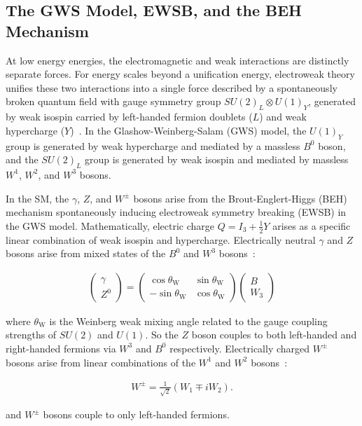 \subsection{The GWS Model, EWSB, and the BEH Mechanism}
At low energy energies, the electromagnetic and weak interactions are distinctly separate forces.
For energy scales beyond a unification energy, electroweak theory unifies these two interactions into a single force described by a spontaneously broken quantum field with gauge symmetry group $SU(2)_L \otimes U(1)_Y$, generated by weak isospin carried by left-handed fermion doublets ($L$) and weak hypercharge ($Y$)~\cite{nagashima_2013_V2}.
In the Glashow-Weinberg-Salam (GWS) model, the $U(1)_Y$ group is generated by weak hypercharge and mediated by a massless $B^0$ boson, and the $SU(2)_L$ group is generated by weak isospin and mediated by massless $W^1$, $W^2$, and $W^3$ bosons.

In the SM, the $\gamma$, $Z$, and $W^\pm$ bosons arise from the Brout-Englert-Higgs (BEH) mechanism spontaneously inducing electroweak symmetry breaking (EWSB) in the GWS model.
Mathematically, electric charge $Q = I_3 + \frac{1}{2} Y$ arises as a specific linear combination of weak isospin and hypercharge.
Electrically neutral $\gamma$ and $Z$ bosons arise from mixed states of the $B^0$ and $W^3$ bosons~\cite{nagashima_2013_V2}:
\begin{linenomath*}
\begin{align}
\left(\begin{array}{c}
\gamma \\
Z^0
\end{array}\right)=\left(\begin{array}{cc}
\cos \theta_{\mathrm{W}} & \sin \theta_{\mathrm{W}} \\
-\sin \theta_{\mathrm{W}} & \cos \theta_{\mathrm{W}}
\end{array}\right)\left(\begin{array}{c}
B \\
W_3
\end{array}\right)
\label{}
\end{align}
\end{linenomath*}
where $\theta_{\mathrm{W}}$ is the Weinberg weak mixing angle related to the gauge coupling strengths of $SU(2)$ and $U(1)$.
So the $Z$ boson couples to both left-handed and right-handed fermions via $W^3$ and $B^0$ respectively.
Electrically charged $W^\pm$ bosons arise from linear combinations of the $W^1$ and $W^2$ bosons~\cite{nagashima_2013_V2}:
\begin{linenomath*}
\begin{align}
W^{\pm}=\frac{1}{\sqrt{2}}\left(W_1 \mp i W_2\right).
\label{}
\end{align}
\end{linenomath*}
and $W^\pm$ bosons couple to only left-handed fermions.

